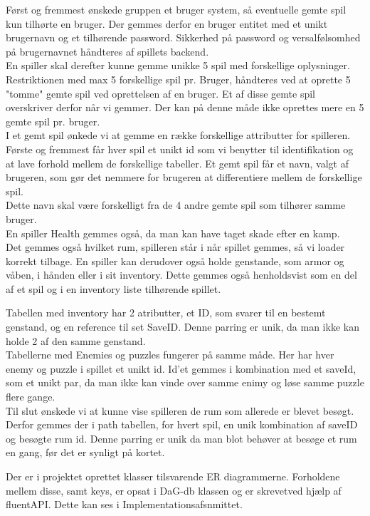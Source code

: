 Først og fremmest ønskede gruppen et bruger system, så eventuelle gemte spil kun tilhørte en bruger.
Der gemmes derfor en bruger entitet med et unikt brugernavn og et tilhørende password.
Sikkerhed på password og versalfølsomhed på brugernavnet håndteres af spillets backend.\\
En spiller skal derefter kunne gemme unikke 5 spil med forskellige oplysninger.
Restriktionen med max 5 forskellige spil pr. Bruger, håndteres ved at oprette 5 "tomme" gemte spil ved oprettelsen af en bruger.
Et af disse gemte spil overskriver derfor når vi gemmer. Der kan på denne måde ikke oprettes mere en 5 gemte spil pr. bruger.\\
I et gemt spil ønkede vi at gemme en række forskellige attributter for spilleren.
Første og fremmest får hver spil et unikt id som vi benytter til identifikation og at lave forhold mellem de forskellige tabeller.
Et gemt spil får et navn, valgt af brugeren, som gør det nemmere for brugeren at differentiere mellem de forskellige spil. \\ Dette navn skal være forskelligt fra de 4 andre gemte spil som tilhører samme bruger.\\
En spiller Health gemmes også, da man kan have taget skade efter en kamp.\\
Det gemmes også hvilket rum, spilleren står i når spillet gemmes, så vi loader korrekt tilbage. 
En spiller kan derudover også holde genstande, som armor og våben, i hånden eller i sit inventory. Dette gemmes også henholdsvist som en del af et spil og i en inventory liste tilhørende spillet. 

Tabellen med inventory har 2 atributter, et ID, som svarer til en bestemt genstand, og en reference til set SaveID. Denne parring er unik, da man ikke kan holde 2 af den samme genstand.\\
Tabellerne med Enemies og puzzles fungerer på samme måde. Her har hver enemy og puzzle i spillet et unikt id. Id’et gemmes i kombination med et saveId, som et unikt par, da man ikke kan vinde over samme enimy og løse samme puzzle flere gange.\\
Til slut ønskede vi at kunne vise spilleren de rum som allerede er blevet besøgt. Derfor gemmes der i path tabellen, for hvert spil, en unik kombination af saveID og besøgte rum id. Denne parring er unik da man blot behøver at besøge et rum en gang, før det er synligt på kortet. 

Der er i projektet oprettet klasser tilsvarende ER diagrammerne.
Forholdene mellem disse, samt keys, er opsat i DaG-db klassen og er skrevetved hjælp af fluentAPI. Dette kan ses i Implementationsafsnmittet.
